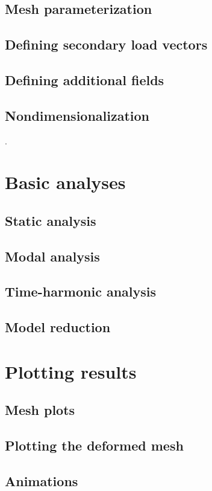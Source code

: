 \documentclass{article}
\begin{document}
\subsection{Mesh parameterization}
\label{parameterization-section}

\subsection{Defining secondary load vectors}
\subsection{Defining additional fields}
\subsection{Nondimensionalization}

.
\section{Basic analyses}

\subsection{Static analysis}
\subsection{Modal analysis}
\subsection{Time-harmonic analysis}
\subsection{Model reduction}


\section{Plotting results}

\subsection{Mesh plots}
\subsection{Plotting the deformed mesh}
\subsection{Animations}
\end{document}
